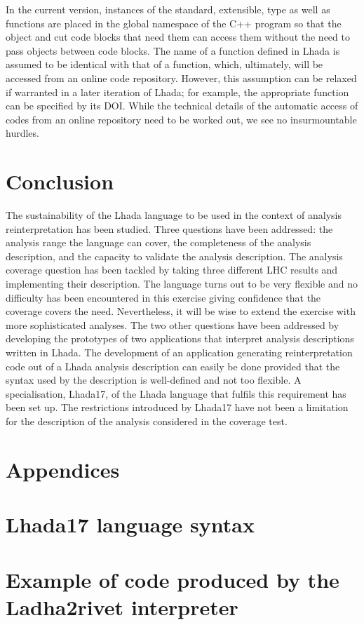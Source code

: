 \documentclass[11pt]{cernrep}
\begin{document}
In the current version, instances of the standard, extensible, type as well as functions are placed in the global namespace of the C++ program so that the object and cut code blocks
that need them can access them without the need to pass objects between code blocks. The name of a function defined in {\sc Lhada} is assumed  to be identical with that of a function, which, ultimately, will be accessed from an online code repository. However, this assumption can be relaxed if warranted in a later iteration of {\sc Lhada}; for example, the appropriate function can be specified by its {\sc DOI}.  While the technical details of the automatic access of
codes from an online repository need to be worked out, we see no insurmountable hurdles.


\section{Conclusion}

The sustainability of the {\sc Lhada} language to be used in the context of analysis reinterpretation has been studied. Three questions have been addressed: the analysis range the language can cover, the completeness of the analysis description, and the capacity to validate the analysis description. The analysis coverage question has been tackled by taking three different LHC results and implementing their description. The language turns out to be very flexible and no difficulty has been encountered in this exercise giving confidence that the coverage covers the need. Nevertheless, it will be wise to extend the exercise with more sophisticated analyses. The two other questions have been addressed by developing the prototypes of two applications that interpret analysis descriptions written in {\sc Lhada}. The development of an application generating reinterpretation code out of a {\sc Lhada} analysis description can easily be done provided that the syntax used by the description is well-defined and not too flexible. A specialisation, {\sc Lhada17}, of the {\sc Lhada} language that fulfils this requirement has been set up. The restrictions introduced by {\sc Lhada17} have not been a limitation for the description of the analysis considered in the coverage test. 



\section*{Appendices}

\appendix

\section{{\sc Lhada17} language syntax}\label{app:ebnf}


\section{Example of code produced by the {\sc Ladha2rivet} interpreter}\label{app:code}

\end{document}
